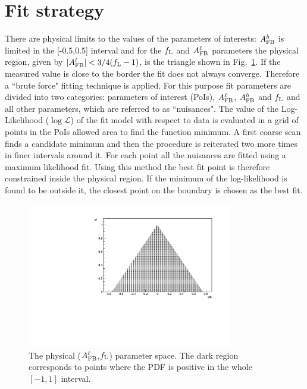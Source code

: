 \section{Fit strategy}

There are physical limits to the values of the parameters of interests:
$A_{\rm FB}^h$ is limited in the [-0.5,0.5] interval and for the $f_{\rm L}$ and 
$A_{\rm FB}^\ell$ parameters the physical region, given by $|A_{\rm FB}^\ell| < 3/4(f_{\rm L}-1)$,
is the triangle shown in Fig.~\ref{fig:pdfscan}.
If the measured value is close to the border the fit does not always converge. Therefore
a ``brute force" fitting technique is applied. For this purpose fit parameters are
divided into two categories: parameters of interest (PoIs), $A_{\rm FB}^\ell$,
$A_{\rm FB}^h$ and $f_{\rm L}$ and all other parameters, which are referred to as ``nuisances".
The value of the Log-Likelihood ($\log\mathcal{L}$) of the fit model with respect to data 
is evaluated in a grid of points in the PoIs allowed area to find the function minimum.
A first coarse scan finds a candidate minimum and then the procedure is reiterated two
more times in finer intervals around it. For each point all the nuisances are fitted
using a maximum likelihood fit. Using this method the best fit point is therefore constrained inside
the physical region. If the minimum of the log-likelihood is found to be outside it, the closest point on
the boundary is chosen as the best fit. %

\begin{figure}[h!]
\centering
\includegraphics[width=0.8\textwidth]{Lmumu/figs/scan.pdf}
\caption{The physical ($A_{\rm FB}^\ell$,$f_{\rm L}$) parameter space. The dark region corresponds 
to points where the PDF is positive in the whole $[-1,1]$ interval. }
\label{fig:pdfscan}
\end{figure}


